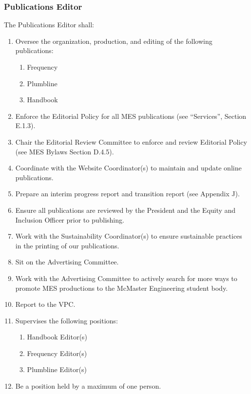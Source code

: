 \hypertarget{publications-editor}{%
 \subsubsection{Publications Editor}
 \label{publications-editor}}
The Publications Editor shall:

\begin{enumerate}
 \item
  Oversee the organization, production, and editing of the following
  publications:

  \begin{enumerate}
   \item
    Frequency
   \item
    Plumbline
   \item
    Handbook
  \end{enumerate}
 \item
  Enforce the Editorial Policy for all MES publications (see
  ``Services'', Section E.1.3).
 \item
  Chair the Editorial Review Committee to enforce and review Editorial
  Policy (see MES Bylaws Section D.4.5).
 \item
  Coordinate with the Website Coordinator(s) to maintain and update
  online publications.
 \item
  Prepare an interim progress report and transition report (see Appendix
  J).
 \item
  Ensure all publications are reviewed by the President and the Equity
  and Inclusion Officer prior to publishing.
 \item
  Work with the Sustainability Coordinator(s) to ensure sustainable
  practices in the printing of our publications.
 \item
  Sit on the Advertising Committee.
 \item
  Work with the Advertising Committee to actively search for more ways
  to promote MES productions to the McMaster Engineering student body.
 \item
  Report to the VPC.
 \item
  Supervises the following positions:

  \begin{enumerate}
   \item
    Handbook Editor(s)
   \item
    Frequency Editor(s)
   \item
    Plumbline Editor(s)
  \end{enumerate}
 \item
  Be a position held by a maximum of one person.

\end{enumerate}

